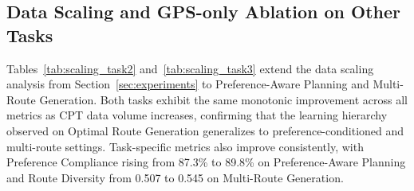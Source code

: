 \documentclass{llmxive}
\providecommand{\arraystretch}{1.05}
\begin{document}
\begin{table}[!htbp]
\centering
\small
\setlength{\tabcolsep}{3pt}
\renewcommand{\arraystretch}{1.05}
\caption{Tool-augmented LLM results on \textbf{Optimal Route Generation} over 1{,}000 test samples. Each LLM retrieves candidate routes from the Amap transit routing API and selects the best one. Estimation Accuracy and MAPE are omitted as numeric fields are inherited from the API. Column headers follow Table~\ref{tab:llm_comparison}.}
\label{tab:rag_comparison}
\end{table}

\subsection{Data Scaling and GPS-only Ablation on Other Tasks}
\label{app:scaling_additional}

Tables~\ref{tab:scaling_task2} and~\ref{tab:scaling_task3} extend the data scaling analysis from Section~\ref{sec:experiments} to Preference-Aware Planning and Multi-Route Generation. Both tasks exhibit the same monotonic improvement across all metrics as CPT data volume increases, confirming that the learning hierarchy observed on Optimal Route Generation generalizes to preference-conditioned and multi-route settings. Task-specific metrics also improve consistently, with Preference Compliance rising from 87.3\% to 89.8\% on Preference-Aware Planning and Route Diversity from 0.507 to 0.545 on Multi-Route Generation.
\end{document}
